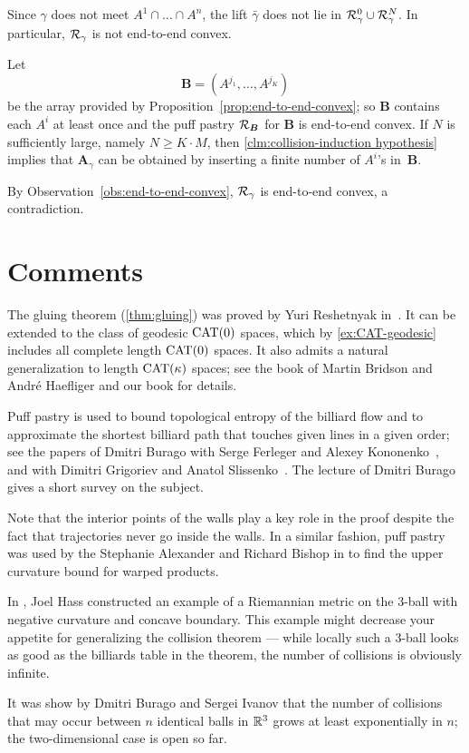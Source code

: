 Since $\gamma$ does not meet $A^1\cap\dots\cap A^n$,
the lift $\bar\gamma$ does not lie in  $\mathcal{R}_\gamma^0\cup \mathcal{R}_\gamma^N$.
In particular, $\mathcal{R}_\gamma$ is not end-to-end convex.

Let 
\[\bm{B}=(A^{j_1},\dots,A^{j_K})\] 
be the array provided by Proposition~\ref{prop:end-to-end-convex};
so $\bm{B}$ contains each $A^i$ at least once
and the puff pastry $\mathcal{R}_{\bm{B}}$ for $\bm{B}$ is end-to-end convex.
If $N$ is sufficiently large, namely $N\ge K\cdot M$, then
 \ref{clm:collision-induction hypothesis}
implies that $\bm{A}_\gamma$ can be obtained  
by inserting a finite number of $A^i$'s in~$\bm{B}$.

By Observation~\ref{obs:end-to-end-convex}, 
$\mathcal{R}_\gamma$ is end-to-end convex, a contradiction.
\qeds

\section{Comments}

The gluing theorem (\ref{thm:gluing}) was proved by Yuri Reshetnyak in~\cite{reshetnyak:glue}.
It can be extended to the class of geodesic $\mathrm{CAT}(0)$ spaces, 
which by \ref{ex:CAT-geodesic} includes all complete length $\mathrm{CAT}(0)$ spaces.
It also admits a natural generalization to 
length $\mathrm{CAT}(\kappa)$
spaces;
see the book of Martin Bridson and  Andr\'e Haefliger \cite{bridson-haefliger} and our book \cite{alexander-kapovitch-petrunin-2025} for details.


Puff pastry is used to bound topological entropy of the billiard flow 
and to approximate the shortest billiard path that  touches given lines in a given order; 
see the papers of Dmitri Burago with  Serge Ferleger
and Alexey Kononenko~\cite{burago-ferleger-kononenko-1998}, and with
Dimitri Grigoriev and Anatol Slissenko~\cite{burago-grigoriev-slissenko}.
The lecture of Dmitri Burago \cite{burago-1998} gives a short survey on the subject.

Note that the interior points of the walls play a key role in the proof
despite the fact that trajectories never go inside the walls.
In a similar fashion, puff pastry was used by the Stephanie Alexander and Richard Bishop in \cite{alexander-bishop}
to find the upper curvature bound for warped products.

In \cite{hass},
Joel Hass constructed an example of a Riemannian metric on the 3-ball with negative curvature and concave boundary.
This example might decrease your appetite for generalizing the collision theorem --- while
locally such a 3-ball looks as good as the billiards table in the theorem, the number of collisions is obviously infinite.

It was show by Dmitri Burago and Sergei Ivanov \cite{burago-ivanov} that the number of collisions that may occur between $n$ identical balls in $\mathbb{R}^3$ grows at least exponentially in $n$; the two-dimensional case is open so far.



